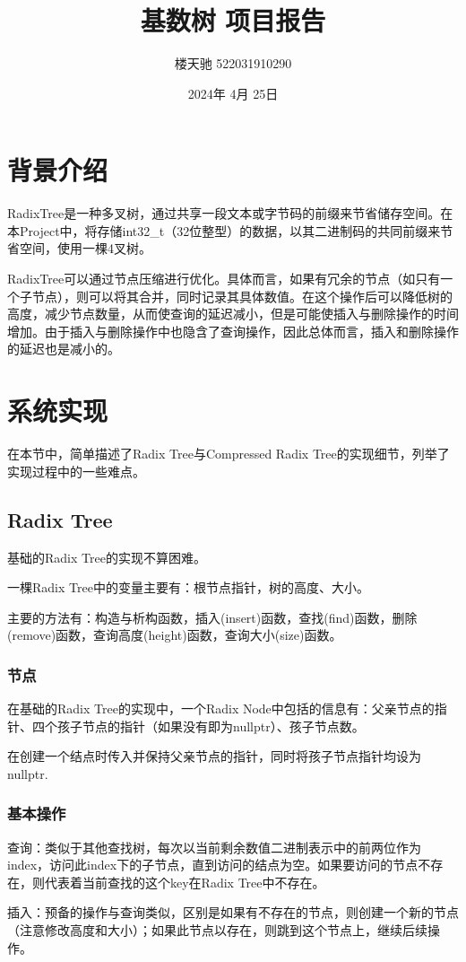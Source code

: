 \documentclass[fontset=windows]{article}
\title{基数树 项目报告}
\author{楼天驰 522031910290}
\date{2024年 4月 25日}
\begin{document}
\maketitle
    
\section{背景介绍}
RadixTree是一种多叉树，通过共享一段文本或字节码的前缀来节省储存空间。在本Project中，将存储int32\_t（32位整型）的数据，以其二进制码的共同前缀来节省空间，使用一棵4叉树。

RadixTree可以通过节点压缩进行优化。具体而言，如果有冗余的节点（如只有一个子节点），则可以将其合并，同时记录其具体数值。在这个操作后可以降低树的高度，减少节点数量，从而使查询的延迟减小，但是可能使插入与删除操作的时间增加。由于插入与删除操作中也隐含了查询操作，因此总体而言，插入和删除操作的延迟也是减小的。

\section{系统实现}
在本节中，简单描述了Radix Tree与Compressed Radix Tree的实现细节，列举了实现过程中的一些难点。
\subsection{Radix Tree}
基础的Radix Tree的实现不算困难。

一棵Radix Tree中的变量主要有：根节点指针，树的高度、大小。

主要的方法有：构造与析构函数，插入(insert)函数，查找(find)函数，删除(remove)函数，查询高度(height)函数，查询大小(size)函数。
\subsubsection{节点}
在基础的Radix Tree的实现中，一个Radix Node中包括的信息有：父亲节点的指针、四个孩子节点的指针（如果没有即为nullptr）、孩子节点数。

在创建一个结点时传入并保持父亲节点的指针，同时将孩子节点指针均设为nullptr.

\subsubsection{基本操作}
查询：类似于其他查找树，每次以当前剩余数值二进制表示中的前两位作为index，访问此index下的子节点，直到访问的结点为空。如果要访问的节点不存在，则代表着当前查找的这个key在Radix Tree中不存在。

插入：预备的操作与查询类似，区别是如果有不存在的节点，则创建一个新的节点（注意修改高度和大小）；如果此节点以存在，则跳到这个节点上，继续后续操作。
\end{document}
